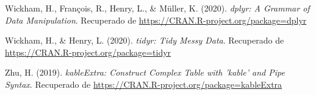 \documentclass[
]{article}
\begin{document}
\leavevmode\hypertarget{ref-dplyr}{}%
Wickham, H., François, R., Henry, L., \& Müller, K. (2020). \emph{dplyr:
A Grammar of Data Manipulation}. Recuperado de
\url{https://CRAN.R-project.org/package=dplyr}

\leavevmode\hypertarget{ref-tidyr}{}%
Wickham, H., \& Henry, L. (2020). \emph{tidyr: Tidy Messy Data}.
Recuperado de \url{https://CRAN.R-project.org/package=tidyr}

\leavevmode\hypertarget{ref-kableExtra}{}%
Zhu, H. (2019). \emph{kableExtra: Construct Complex Table with 'kable'
and Pipe Syntax}. Recuperado de
\url{https://CRAN.R-project.org/package=kableExtra}
\end{document}
